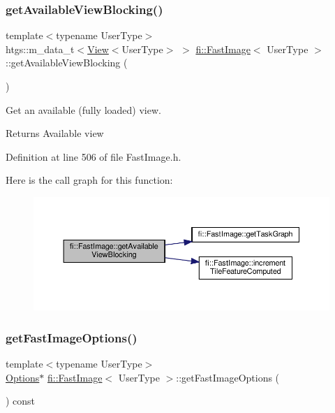 \subsubsection{\texorpdfstring{get\+Available\+View\+Blocking()}{getAvailableViewBlocking()}}
{\footnotesize\ttfamily template$<$typename User\+Type$>$ \\
htgs\+::m\+\_\+data\+\_\+t$<$\hyperlink{classfi_1_1View}{View}$<$User\+Type$>$ $>$ \hyperlink{classfi_1_1FastImage}{fi\+::\+Fast\+Image}$<$ User\+Type $>$\+::get\+Available\+View\+Blocking (\begin{DoxyParamCaption}{ }\end{DoxyParamCaption})\hspace{0.3cm}{\ttfamily [inline]}}



Get an available (fully loaded) view. 

\begin{DoxyReturn}{Returns}
Available view 
\end{DoxyReturn}


Definition at line 506 of file Fast\+Image.\+h.

Here is the call graph for this function\+:
\nopagebreak
\begin{figure}[H]
\begin{center}
\leavevmode
\includegraphics[width=350pt]{dc/d6b/classfi_1_1FastImage_aa7c2a5653c878ef1d7f31360eaa85171_cgraph}
\end{center}
\end{figure}
\mbox{\label{classfi_1_1FastImage_ada03468c50745d94854fcbe87227bbfd}} 
\subsubsection{\texorpdfstring{get\+Fast\+Image\+Options()}{getFastImageOptions()}}
{\footnotesize\ttfamily template$<$typename User\+Type$>$ \\
\hyperlink{classfi_1_1FastImage_1_1Options}{Options}$\ast$ \hyperlink{classfi_1_1FastImage}{fi\+::\+Fast\+Image}$<$ User\+Type $>$\+::get\+Fast\+Image\+Options (\begin{DoxyParamCaption}{ }\end{DoxyParamCaption}) const\hspace{0.3cm}{\ttfamily [inline]}}



